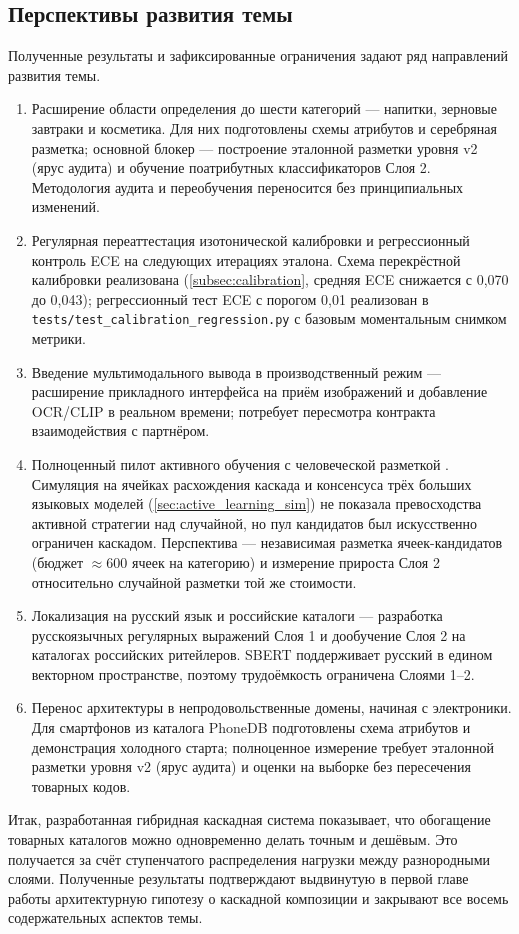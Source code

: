 \subsection*{Перспективы развития темы}

Полученные результаты и зафиксированные ограничения задают ряд направлений развития темы.

\begin{enumerate}[label=\arabic*)]
    \item Расширение области определения до шести категорий — напитки, зерновые завтраки и косметика. Для них подготовлены схемы атрибутов и серебряная разметка; основной блокер — построение эталонной разметки уровня v2 (ярус аудита) и обучение поатрибутных классификаторов Слоя 2. Методология аудита и переобучения переносится без принципиальных изменений.
    \item Регулярная переаттестация изотонической калибровки и регрессионный контроль ECE на следующих итерациях эталона. Схема перекрёстной калибровки реализована (\ref{subsec:calibration}, средняя ECE снижается с 0,070 до 0,043); регрессионный тест ECE с порогом 0,01 реализован в \texttt{tests/test\_calibration\_regression.py} с базовым моментальным снимком метрики.
    \item Введение мультимодального вывода в производственный режим — расширение прикладного интерфейса на приём изображений и добавление OCR/CLIP в реальном времени; потребует пересмотра контракта взаимодействия с партнёром.
    \item Полноценный пилот активного обучения с человеческой разметкой \cite{ref_46, ref_39}. Симуляция на ячейках расхождения каскада и консенсуса трёх больших языковых моделей (\ref{sec:active_learning_sim}) не показала превосходства активной стратегии над случайной, но пул кандидатов был искусственно ограничен каскадом. Перспектива — независимая разметка ячеек-кандидатов (бюджет $\approx 600$ ячеек на категорию) и измерение прироста Слоя 2 относительно случайной разметки той же стоимости.
    \item Локализация на русский язык и российские каталоги — разработка русскоязычных регулярных выражений Слоя 1 и дообучение Слоя 2 на каталогах российских ритейлеров. SBERT поддерживает русский в едином векторном пространстве, поэтому трудоёмкость ограничена Слоями 1--2.
    \item Перенос архитектуры в непродовольственные домены, начиная с электроники. Для смартфонов из каталога PhoneDB подготовлены схема атрибутов и демонстрация холодного старта; полноценное измерение требует эталонной разметки уровня v2 (ярус аудита) и оценки на выборке без пересечения товарных кодов.
\end{enumerate}

Итак, разработанная гибридная каскадная система показывает, что обогащение товарных каталогов можно одновременно делать точным и дешёвым. Это получается за счёт ступенчатого распределения нагрузки между разнородными слоями. Полученные результаты подтверждают выдвинутую в первой главе работы архитектурную гипотезу о каскадной композиции и закрывают все восемь содержательных аспектов темы.

